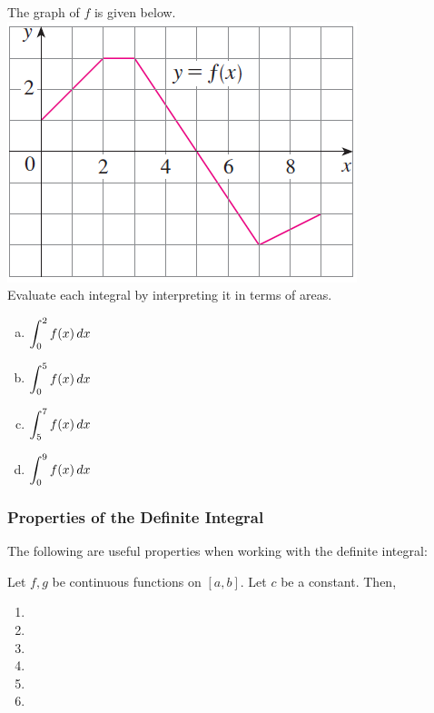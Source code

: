 \documentclass[notes]{subfiles}
\begin{document}
		\begin{ex}
			The graph of \(f\) is given below.\\
			\includegraphics{5.2fig1}\\
			Evaluate each integral by interpreting it in terms of areas.
			\begin{enumerate}[(a)]
				\item \(\displaystyle \int_0^2 f(x)\, dx\)
					
				\item \(\displaystyle \int_0^5 f(x)\, dx\)
					
				\item \(\displaystyle \int_5^7 f(x)\, dx\)
					
				\item \(\displaystyle \int_0^9 f(x)\, dx\)
			\end{enumerate}
		\end{ex}
			\newpage
			
	\subsubsection*{Properties of the Definite Integral}
		The following are useful properties when working with the definite integral:
			\begin{thm}
				 Let \(f,g\) be continuous functions on \([a,b]\).  Let \(c\) be a constant.  Then, \\
					\begin{enumerate}[(1)]
					\setlength\itemsep{35pt}
						\item 
						\item 
						\item 
						\item 
						\item 
						\item 
					\end{enumerate}
				
			\end{thm}
		
\end{document}
